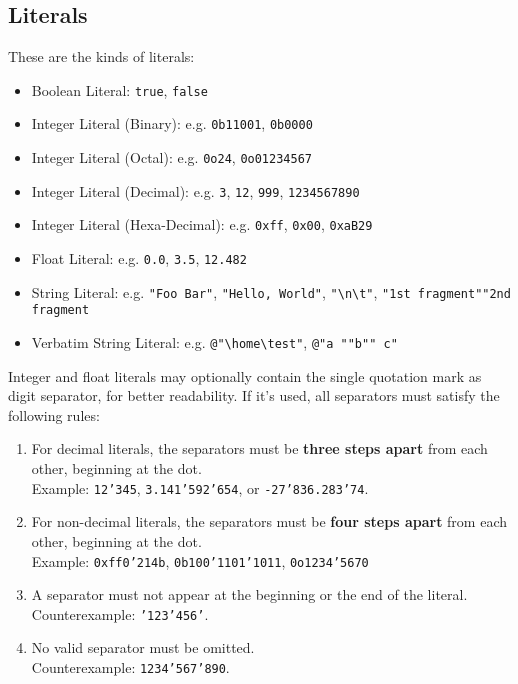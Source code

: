 \documentclass{report}
\begin{document}
\subsection{Literals}

These are the kinds of literals:
\begin{itemize}
	\item Boolean Literal: \texttt{true}, \texttt{false}
	\item Integer Literal (Binary): e.g. \texttt{0b11001}, \texttt{0b0000}
	\item Integer Literal (Octal): e.g. \texttt{0o24}, \texttt{0o01234567}
	\item Integer Literal (Decimal): e.g. \texttt{3}, \texttt{12}, \texttt{999}, \texttt{1234567890}
	\item Integer Literal (Hexa-Decimal): e.g. \texttt{0xff}, \texttt{0x00}, \texttt{0xaB29}
	\item Float Literal: e.g. \texttt{0.0}, \texttt{3.5}, \texttt{12.482}
	\item String Literal: e.g. \texttt{"Foo Bar"}, \texttt{"Hello, World"}, \texttt{"\textbackslash n\textbackslash t"},
		\texttt{"1st fragment"\textvisiblespace"2nd fragment}
	\item Verbatim String Literal: e.g. \texttt{@"\textbackslash home\textbackslash test"}, \texttt{@"a ""b"" c"}
\end{itemize}
Integer and float literals may optionally contain the single quotation mark as digit separator, for better readability.
If it's used, all separators must satisfy the following rules:
\begin{enumerate}
	\item For decimal literals, the separators must be \textbf{three steps apart} from each other, beginning at the dot. \\
		Example: \texttt{12'345}, \texttt{3.141'592'654}, or \texttt{-27'836.283'74}.
	\item For non-decimal literals, the separators must be \textbf{four steps apart} from each other, beginning at the dot. \\
		Example: \texttt{0xff0'214b}, \texttt{0b100'1101'1011}, \texttt{0o1234'5670}
	\item A separator must not appear at the beginning or the end of the literal. \\
		Counterexample: \texttt{'123'456'}.
	\item No valid separator must be omitted. \\
		Counterexample: \texttt{1234'567'890}.
\end{enumerate}
\end{document}
